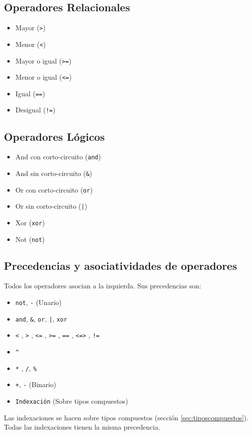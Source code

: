 \documentclass[12pt, spanish]{report}
\begin{document}
\subsection{Operadores Relacionales}
\begin{itemize}
\item Mayor         (\texttt{>})
\item Menor         (\texttt{<})
\item Mayor o igual (\texttt{>=})
\item Menor o igual (\texttt{<=})
\item Igual (\texttt{==})
\item Desigual      (\texttt{!=})
\end{itemize}

\subsection{Operadores L\'ogicos}
\begin{itemize}
\item And con corto-circuito (\texttt{and})
\item And sin corto-circuito (\texttt{\&})
\item Or con corto-circuito  (\texttt{or})
\item Or sin corto-circuito  (\texttt{|})
\item Xor (\texttt{xor})
\item Not (\texttt{not})
\end{itemize}

\subsection{Precedencias y asociatividades de operadores}
\label{sec:basic_preced}
Todos los operadores asocian a la izquierda. Sus precedencias son:
\begin{itemize}
\item \texttt{not}, \texttt{-} (Unario)
\item \texttt{and}, \texttt{\&}, \texttt{or}, \texttt{|}, \texttt{xor}
\item \texttt{<} , \texttt{>} , \texttt{<=} , \texttt{>=} , \texttt{==} , \texttt{<=>} , \texttt{!=}
\item \texttt{\^}
\item \texttt{*} ,  \texttt{/}, \texttt{\%}
\item \texttt{+}, \texttt{-} (Binario)
\item \texttt{Indexaci\'on} (Sobre tipos compuestos)
\end{itemize}
Las indexaciones se hacen sobre tipos compuestos (secci\'on \ref{sec:tiposcompuestos}).
Todas las indexaciones tienen la misma precedencia.
\end{document}
